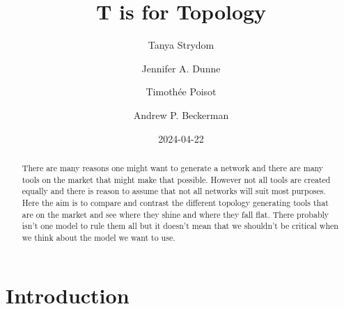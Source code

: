 \documentclass[
  letterpaper,
  DIV=11,
  numbers=noendperiod]{scrartcl}
\title{T is for Topology}
\author{Tanya Strydom \and Jennifer A. Dunne \and Timothée
Poisot \and Andrew P. Beckerman}
\date{2024-04-22}
\begin{document}
\maketitle
\begin{abstract}
There are many reasons one might want to generate a network and there
are many tools on the market that might make that possible. However not
all tools are created equally and there is reason to assume that not all
networks will suit most purposes. Here the aim is to compare and
contrast the different topology generating tools that are on the market
and see where they shine and where they fall flat. There probably isn't
one model to rule them all but it doesn't mean that we shouldn't be
critical when we think about the model we want to use.
\end{abstract}

\section{Introduction}\label{introduction}
\end{document}
